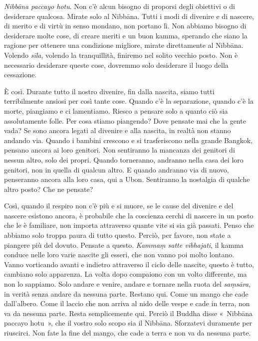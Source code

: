 \emph{Nibbāna paccayo hotu}. Non c'è alcun bisogno di proporsi degli
obiettivi o di desiderare qualcosa. Mirate solo al Nibbāna. Tutti
i modi di divenire e di nascere, di merito e di virtù in senso mondano,
non portano lì. Non abbiamo bisogno di desiderare molte cose, di creare
meriti e un buon kamma, sperando che siano la ragione per
ottenere una condizione migliore, mirate direttamente al Nibbāna.
Volendo \emph{sīla}, volendo la tranquillità, finiremo nel solito
vecchio posto. Non è necessario desiderare queste cose, dovremmo solo
desiderare il luogo della cessazione.

È così. Durante tutto il nostro divenire, fin dalla nascita, siamo tutti
terribilmente ansiosi per così tante cose. Quando c'è la separazione,
quando c'è la morte, piangiamo e ci lamentiamo. Riesco a pensare solo a
quanto ciò sia assolutamente folle. Per cosa stiamo piangendo? Dove
pensate mai che la gente vada? Se sono ancora legati al divenire e alla
nascita, in realtà non stanno andando via. Quando i bambini crescono e
si trasferiscono nella grande Bangkok, pensano ancora ai loro genitori.
Non sentiranno la mancanza dei genitori di nessun altro, solo dei
propri. Quando torneranno, andranno nella casa dei loro genitori, non in
quella di qualcun altro. E quando andranno via di nuovo, penseranno
ancora alla loro casa, qui a Ubon. Sentiranno la nostalgia di qualche
altro posto? Che ne pensate?

Così, quando il respiro non c'è più e si muore, se le cause del divenire
e del nascere esistono ancora, è probabile che la coscienza cerchi di
nascere in un posto che le è familiare, non importa attraverso quante
vite si sia già passati. Penso che abbiamo solo troppa paura di tutto
questo. Perciò, per favore, non state a piangere più del dovuto. Pensate
a questo. \emph{Kammaṃ satte vibhajati}, il kamma conduce nelle
loro varie nascite gli esseri, che non vanno poi molto lontano. Vanno
vorticando avanti e indietro attraverso il ciclo delle nascite, questo è
tutto, cambiano solo apparenza. La volta dopo compaiono con un volto
differente, ma non lo sappiamo. Solo andare e venire, andare e tornare
nella ruota del \emph{saṃsāra}, in verità senza andare da nessuna parte.
Restano qui. Come un mango che cade dall'albero. Come il laccio che non
arriva al nido delle vespe e cade in terra, non va da nessuna parte.
Resta semplicemente qui. Perciò il Buddha disse «~Nibbāna paccayo
hotu~», che il vostro solo scopo sia il Nibbāna. Sforzatevi
duramente per riuscirci. Non fate la fine del mango, che cade a terra e
non va da nessuna parte.

